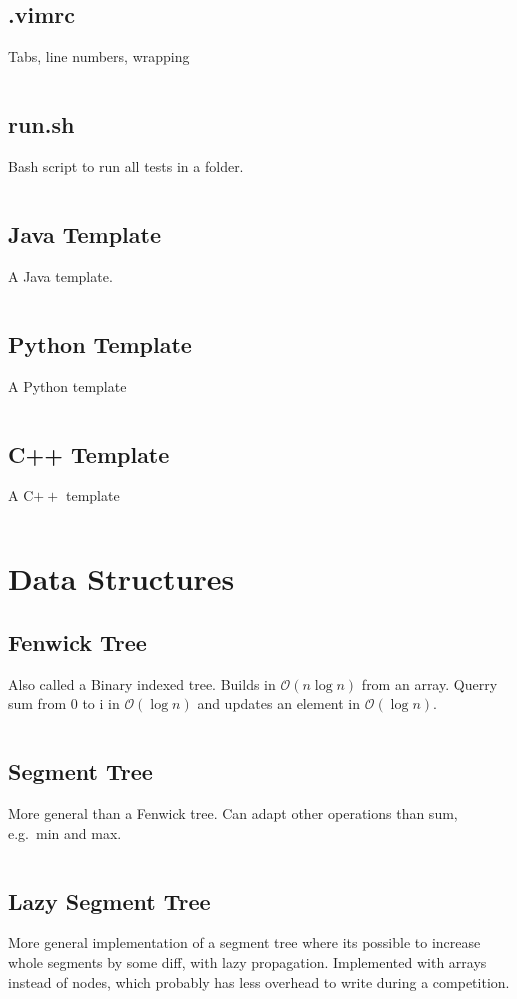 \documentclass[8pt,a4paper,landscape,oneside]{amsart}
\newcommand{\codej}[1]{\inputminted[fontsize=\large,tabsize=2,baselinestretch=1]{java}{src/#1}}
\newcommand{\codec}[1]{\inputminted[fontsize=\large,tabsize=2,baselinestretch=1]{cpp}{src/#1}}
\newcommand{\codep}[1]{\inputminted[fontsize=\large,tabsize=2,baselinestretch=1]{py}{src/#1}}
\newcommand{\codeb}[1]{\inputminted[fontsize=\large,tabsize=2,baselinestretch=1]{bash}{src/#1}}
\newcommand{\codev}[1]{\inputminted[fontsize=\large,tabsize=2,baselinestretch=1]{vim}{src/#1}}
\newcommand{\bigO}{\mathcal{O}}
\begin{document}
\begin{multicols*}{2}
\begin{large}
    \subsection{.vimrc}
        Tabs, line numbers, wrapping
        \codev{.vimrc}
    \subsection{run.sh}
        Bash script to run all tests in a folder.
        \codeb{run.sh}
    \subsection{Java Template}
        A Java template.
        \codej{template.java}
    \subsection{Python Template}
        A Python template
        \codep{template.py}
    \subsection{C++ Template}
        A C$++$ template
        \codec{template.cpp}

\section{Data Structures}
    \subsection{Fenwick Tree}
        Also called a Binary indexed tree. Builds in $\bigO(n \log{n})$ from an array. Querry sum from 0 to i in $\bigO(\log{n})$ and updates an element in $\bigO(\log{n})$.
        \codep{datastructures/fenwick_tree.py}
    \subsection{Segment Tree}
        More general than a Fenwick tree. Can adapt other operations than sum, e.g.\ min and max.
        \codep{datastructures/segment_tree.py}
    \subsection{Lazy Segment Tree}
        More general implementation of a segment tree where its possible to increase whole segments by some diff, with lazy propagation. Implemented with arrays instead of nodes, which probably has less overhead to write during a competition.
        \codej{datastructures/LazySegmentTree.java}

\end{large}
\end{multicols*}
\end{document}
